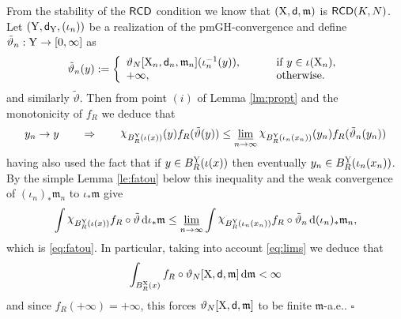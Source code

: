 \documentclass[reqno,11pt]{article}
\numberwithin{equation}{section}
\newcommand{\mm}{{\mbox{\boldmath$m$}}}
\newcommand{\sfd}{{\sf d}}
\renewcommand{\d}{{\mathrm d}}
\newcommand{\nchi}{{\raise.3ex\hbox{$\chi$}}}
\newcommand{\limi}{\varliminf}
\renewcommand{\mm}{\mathfrak m}                                %
\renewenvironment{proof}{\removelastskip\par\medskip   %
\noindent{\em Proof} \rm}{\penalty-20\null\hfill$\square$\par\medbreak}
\newcommand{\X}{{\rm X}}
\newcommand{\Y}{{\rm Y}}
\newcommand{\RCD}{{\sf RCD}}
\begin{document}
\begin{proof} From the stability of the $\RCD$ condition we know that $(\X,\sfd,\mm)$ is $\RCD(K,N)$.
Let $(\Y,\sfd_\Y,(\iota_n))$ be a realization of the pmGH-convergence and define $\tilde\vartheta_n:\Y\to[0,\infty]$ as
\[
\tilde\vartheta_n(y):=\left\{\begin{array}{ll}
\vartheta_N[\X_n,\sfd_n,\mm_n](\iota_n^{-1}(y)),&\qquad\text{ if }y\in\iota(\X_n),\\
+\infty,&\qquad\text{ otherwise}.
\end{array}\right.
\]
and similarly $\tilde\vartheta$. Then from point $(i)$ of Lemma \ref{lm:propt} and the monotonicity of $f_R$ we deduce that
\[
y_n\to y\qquad\Rightarrow\qquad {\nchi_{B_R^\Y(\iota(x))}(y)} f_R(\tilde\vartheta(y))\leq\limi_{n\to\infty}{\nchi_{B_R^\Y(\iota_n(x_n))}(y_n)} f_R(\tilde\vartheta_n(y_n))
\]
 { having also used the  fact that if $y\in B_R^\Y(\iota(x))$ then eventually  $y_n\in B_R^\Y(\iota_n(x_n))$.} By the simple Lemma \ref{le:fatou} below  this inequality and the weak convergence of $(\iota_n)_*\mm_n$ to $\iota_*\mm$ give
\[
\int\nchi_{B_R^\Y(\iota(x))}f_R\circ\tilde \vartheta\,\d \iota_*\mm\leq\limi_{n\to\infty} \int\nchi_{B^{\Y}_R(\iota_n(x_n))}f_R\circ\tilde \vartheta_n\,\d(\iota_n)_*\mm_n,
\]
which is \eqref{eq:fatou}. In particular, taking into account \eqref{eq:lims} we deduce that
\[
\int_{B^\X_R(x)}f_R\circ\vartheta_N[\X,\sfd,\mm]\,\d\mm<\infty
\]
and since $f_R(+\infty)=+\infty$, this forces $\vartheta_N[\X,\sfd,\mm]$ to be finite $\mm$-a.e..
\end{proof}
\end{document}

